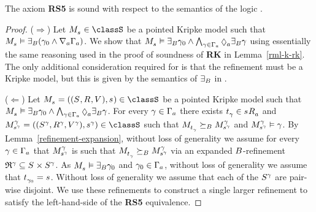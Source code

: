 \begin{lemma}\label{rml-s5-rs5}
The axiom {\bf RS5} is sound with respect to the semantics of the logic \logicRmlS{}.
\end{lemma}

\begin{proof}
($\Rightarrow$) 
Let $\kPModel{\kStateS} \in \classS$ be a pointed Kripke model such that $\kPModel{\kStateS} \entails \somerefsBs (\gamma_0 \land \coversA \Gamma_\agentA)$.
We show that $\kPModel{\kStateS} \entails \somerefsBs \gamma_0 \land \bigwedge_{\gamma \in \Gamma_\agentA} \possibleA \somerefsBs \gamma$ using essentially the same reasoning used in the proof of soundness of {\bf RK} in Lemma~\ref{rml-k-rk}.
The only additional consideration required for \logicRmlS{} is that the refinement must be a \classS{} Kripke model, but this is given by the semantics of $\somerefsBs$ in \logicRmlS{}.

($\Leftarrow$)
Let $\kPModelAndTuple{\kStateS} \in \classS$ be a pointed Kripke model such that $\kPModel{\kStateS} \entails \somerefsBs \gamma_0 \land \bigwedge_{\gamma \in \Gamma_\agentA} \possibleA \somerefsBs \gamma$.
For every $\gamma \in \Gamma_\agentA$ there exists $\kStateT_\gamma \in \kSuccessorsA{\kStateS}$ and $\kPModelAndTuple[\gamma]{\kStateS[\gamma]} \in \classS$ such that $\kPModel{\kStateT_\gamma} \simulatesBs \kPModel[\gamma]{\kStateS[\gamma]}$ and $\kPModel[\gamma]{\kStateS[\gamma]} \entails \gamma$.
By Lemma~\ref{refinement-expansion}, without loss of generality we assume for every $\gamma \in \Gamma_\agentA$ that $\kPModel[\gamma]{\kStateS[\gamma]}$ is such that $\kPModel{\kStateT_\gamma} \simulatesBs \kPModel[\gamma]{\kStateS[\gamma]}$ via an expanded $\agentsB$-refinement $\refinement^{\gamma} \subseteq \kStates \times \kStates[\gamma]$.
As $\kPModel{\kStateS} \entails \somerefsBs \gamma_0$ and $\gamma_0 \in \Gamma_\agentA$, without loss of generality we assume that $\kStateT_{\gamma_0} = \kStateS$.
Without loss of generality we assume that each of the $\kStates[\gamma]$ are pair-wise disjoint.
We use these refinements to construct a single larger refinement to satisfy the left-hand-side of the {\bf RS5} equivalence.


\end{proof}
